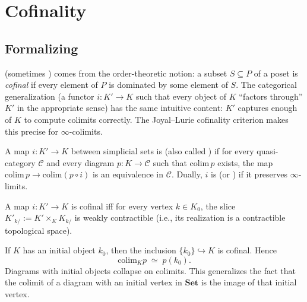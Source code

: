\section{Cofinality}
\label{sec:cofinality}

\subsection{Formalizing}

\begin{nameorigin}
 (sometimes ) comes from the order-theoretic
notion: a subset $S \subseteq P$ of a poset is \emph{cofinal} if every
element of $P$ is dominated by some element of $S$. The categorical
generalization (a functor $i : K' \to K$ such that every object of $K$
``factors through'' $K'$ in the appropriate sense) has the same
intuitive content: $K'$ captures enough of $K$ to compute colimits
correctly. The Joyal--Lurie cofinality criterion makes this precise
for $\infty$-colimits.
\end{nameorigin}

\begin{definition}
\label{def:cofinal}
A map $i : K' \to K$ between simplicial sets is  (also
called ) if for every quasi-category $\mathcal{C}$ and every
diagram $p : K \to \mathcal{C}$ such that $\mathrm{colim}\, p$ exists,
the map $\mathrm{colim}\, p \to \mathrm{colim}(p \circ i)$ is an
equivalence in $\mathcal{C}$. Dually, $i$ is  (or
) if it preserves $\infty$-limits.
\end{definition}

\begin{theorem}
\label{thm:joyal-lurie-cofinal}
A map $i : K' \to K$ is cofinal iff for every vertex $k \in K_0$, the
slice $K'_{k/} := K' \times_K K_{k/}$ is weakly contractible (i.e., its
realization is a contractible topological space).
\end{theorem}

\begin{example_thm}
\label{ex:initial-inclusion}
If $K$ has an initial object $k_0$, then the inclusion $\{k_0\}
\hookrightarrow K$ is cofinal. Hence
\begin{equation*}
  \mathrm{colim}_K p \;\simeq\; p(k_0).
\end{equation*}
Diagrams with initial objects collapse on colimits. This generalizes the
fact that the colimit of a diagram with an initial vertex in $\mathbf{Set}$
is the image of that initial vertex.
\end{example_thm}

